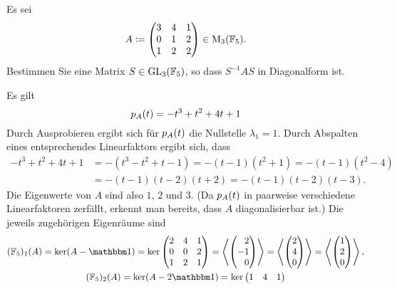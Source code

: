 \documentclass[a4paper, 10pt]{scrartcl}
\begin{document}
\begin{question}[subtitle = Diagonalisieren über $\Field_5$]
  Es sei
  \[
              A
    \coloneqq \begin{pmatrix}
                3 & 4 & 1 \\
                0 & 1 & 2 \\
                1 & 2 & 2
              \end{pmatrix}
    \in       \operatorname{M}_{3}(\mathbb{F}_5).
  \]
  Bestimmen Sie eine Matrix $S \in \operatorname{GL}_{3}(\mathbb{F}_5)$, so dass $S^{-1} A S$ in Diagonalform ist.
\end{question}





\begin{solution}
  Es gilt
  \[
      p_{A}(t)
    = - t^3 + t^2 + 4 t + 1
  \]
  Durch Ausprobieren ergibt sich für $p_{A}(t)$ die Nullstelle $\lambda_1 = 1$.
  Durch Abspalten eines entsprechendes Linearfaktors ergibt sich, dass
  \begin{align*}
        - t^3 + t^2 + 4 t + 1
    &=  - (t^3 - t^2 + t - 1)
     =  - (t - 1)(t^2 + 1)
     =  - (t - 1)(t^2 - 4)
    \\
    &=  - (t - 1)(t - 2)(t + 2)
     =  - (t - 1)(t - 2)(t - 3).
  \end{align*}
  Die Eigenwerte von $A$ sind also $1$, $2$ und $3$.
  (Da $p_{A}(t)$ in paarweise verschiedene Linearfaktoren zerfällt, erkennt man bereits, dass $A$ diagonalisierbar ist.)
  Die jeweils zugehörigen Eigenräume sind
  \begin{gather*}
      \eigenspace{(\Field_5)}{A}{1}
    = \ker  (A - \Id)
    = \ker  \begin{pmatrix}
              2 & 4 & 1 \\
              0 & 0 & 2 \\
              1 & 2 & 1
            \end{pmatrix}
    = \generated{ \rvect{2 \\ -1 \\ 0} }
    = \generated{ \vect{2 \\ 4 \\ 0} }
    = \generated{ \vect{1 \\ 2 \\ 0} },
  \\
      \eigenspace{(\Field_5)}{A}{2}
    = \ker  (A - 2 \Id)
    = \ker  \begin{pmatrix}
              1 & 4 & 1 \\

\end{pmatrix}
\end{gather*}
\end{solution}
\end{document}
